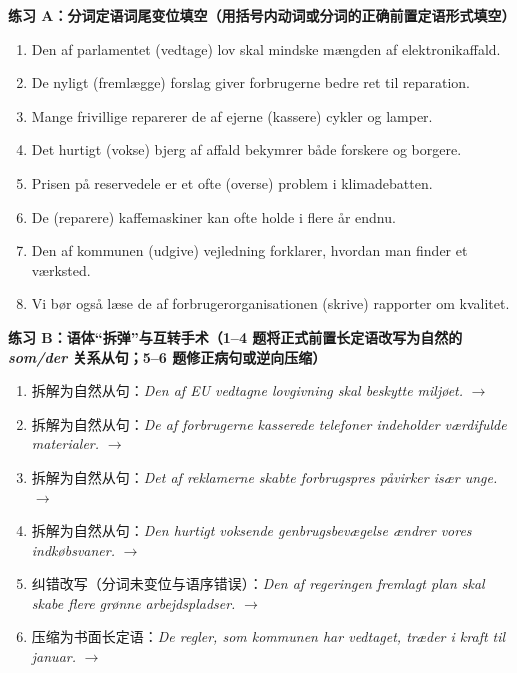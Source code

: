 \textbf{练习 A：分词定语词尾变位填空（用括号内动词或分词的正确前置定语形式填空）}
\begin{enumerate}
  \item Den af parlamentet \underline{\hspace{2.2cm}} (vedtage) lov skal mindske mængden af elektronikaffald.
  \item De nyligt \underline{\hspace{2.2cm}} (fremlægge) forslag giver forbrugerne bedre ret til reparation.
  \item Mange frivillige reparerer de af ejerne \underline{\hspace{2.2cm}} (kassere) cykler og lamper.
  \item Det hurtigt \underline{\hspace{2.2cm}} (vokse) bjerg af affald bekymrer både forskere og borgere.
  \item Prisen på reservedele er et ofte \underline{\hspace{2.2cm}} (overse) problem i klimadebatten.
  \item De \underline{\hspace{2.2cm}} (reparere) kaffemaskiner kan ofte holde i flere år endnu.
  \item Den af kommunen \underline{\hspace{2.2cm}} (udgive) vejledning forklarer, hvordan man finder et værksted.
  \item Vi bør også læse de af forbrugerorganisationen \underline{\hspace{2.2cm}} (skrive) rapporter om kvalitet.
\end{enumerate}

\textbf{练习 B：语体“拆弹”与互转手术（1--4 题将正式前置长定语改写为自然的 \textit{som/der} 关系从句；5--6 题修正病句或逆向压缩）}
\begin{enumerate}
  \item 拆解为自然从句：\textit{Den af EU vedtagne lovgivning skal beskytte miljøet.} $\rightarrow$
  \item 拆解为自然从句：\textit{De af forbrugerne kasserede telefoner indeholder værdifulde materialer.} $\rightarrow$
  \item 拆解为自然从句：\textit{Det af reklamerne skabte forbrugspres påvirker især unge.} $\rightarrow$
  \item 拆解为自然从句：\textit{Den hurtigt voksende genbrugsbevægelse ændrer vores indkøbsvaner.} $\rightarrow$
  \item 纠错改写（分词未变位与语序错误）：\textit{Den af regeringen fremlagt plan skal skabe flere grønne arbejdspladser.} $\rightarrow$
  \item 压缩为书面长定语：\textit{De regler, som kommunen har vedtaget, træder i kraft til januar.} $\rightarrow$
\end{enumerate}

